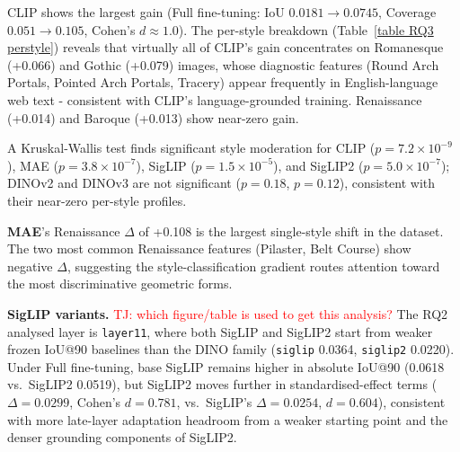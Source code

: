 \documentclass[lineno,pdflatex,sn-mathphys-num]{sn-jnl}%
\theoremstyle{thmstyleone}%
\theoremstyle{thmstyletwo}%
\theoremstyle{thmstylethree}%
\begin{document}
CLIP shows the largest gain (Full fine-tuning: IoU $0.0181\!\to\!0.0745$, Coverage $0.051\!\to\!0.105$, Cohen's $d\!\approx\!1.0$). The per-style breakdown (Table~\ref{table RQ3 perstyle}) reveals that virtually all of CLIP's gain concentrates on Romanesque (+0.066) and Gothic (+0.079) images, whose diagnostic features (Round Arch Portals, Pointed Arch Portals, Tracery) appear frequently in English-language web text - consistent with CLIP's language-grounded training. Renaissance (+0.014) and Baroque (+0.013) show near-zero gain.

A Kruskal-Wallis test finds significant style moderation for CLIP ($p\!=\!7.2\!\times\!10^{-9}$), MAE ($p\!=\!3.8\!\times\!10^{-7}$), SigLIP ($p\!=\!1.5\!\times\!10^{-5}$), and SigLIP2 ($p\!=\!5.0\!\times\!10^{-7}$); DINOv2 and DINOv3 are not significant ($p\!=\!0.18$, $p\!=\!0.12$), consistent with their near-zero per-style profiles.

\textbf{MAE}'s Renaissance $\Delta$ of +0.108 is the largest single-style shift in the dataset. The two most common Renaissance features (Pilaster, Belt Course) show negative $\Delta$, suggesting the style-classification gradient routes attention toward the most discriminative geometric forms.


\textbf{SigLIP variants.} \textcolor{red}{TJ: which figure/table is used to get this analysis?} The RQ2 analysed layer is \texttt{layer11}, where both SigLIP and SigLIP2 start from weaker frozen IoU@90 baselines than the DINO family (\texttt{siglip} 0.0364, \texttt{siglip2} 0.0220). Under Full fine-tuning, base SigLIP remains higher in absolute IoU@90 (0.0618 vs.\ SigLIP2 0.0519), but SigLIP2
moves further in standardised-effect terms ($\Delta\!=\!0.0299$, Cohen's $d\!=\!0.781$, vs.\ SigLIP's $\Delta\!=\!0.0254$, $d\!=\!0.604$), consistent with more late-layer adaptation headroom from a weaker starting point and the denser grounding components of SigLIP2.
\end{document}
